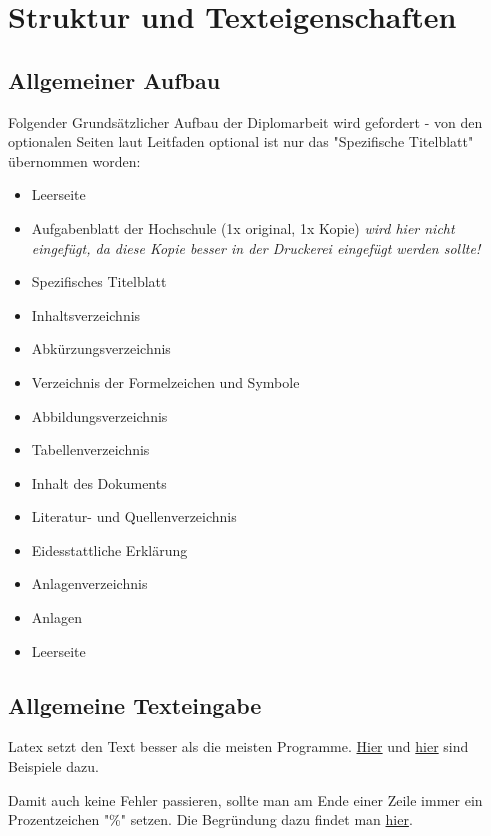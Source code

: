 \chapter{Struktur und Texteigenschaften}%
\section{Allgemeiner Aufbau}%
Folgender Grundsätzlicher Aufbau der Diplomarbeit wird gefordert - von den optionalen Seiten laut Leitfaden optional ist nur das "Spezifische Titelblatt" übernommen worden:\\%
\begin{itemize}%
 \item Leerseite%
 \item Aufgabenblatt der Hochschule (1x original, 1x Kopie) \emph{wird hier nicht eingefügt, da diese Kopie besser in der Druckerei eingefügt werden sollte!}%
 \item Spezifisches Titelblatt%
 \item Inhaltsverzeichnis%
 \item Abkürzungsverzeichnis%
 \item Verzeichnis der Formelzeichen und Symbole%
 \item Abbildungsverzeichnis%
 \item Tabellenverzeichnis%
 \item Inhalt des Dokuments%
 \item Literatur- und Quellenverzeichnis%
 \item Eidesstattliche Erklärung%
 \item Anlagenverzeichnis%
 \item Anlagen%
 \item Leerseite%
\end{itemize}%
%
\section{Allgemeine Texteingabe}%
Latex setzt den Text besser als die meisten Programme. \href{https://tex.stackexchange.com/questions/110133/visual-comparison-between-latex-and-word-output-hyphenation-typesetting-ligat#110140}{Hier} und \href{http://www.rtznet.nl/zink/latex.php}{hier} sind Beispiele dazu.%

Damit auch keine Fehler passieren, sollte man am Ende einer Zeile immer ein Prozentzeichen "\%" setzen. Die Begründung dazu findet man \href{https://tex.stackexchange.com/questions/7453/what-is-the-use-of-percent-signs-at-the-end-of-lines#7459}{hier}.%


